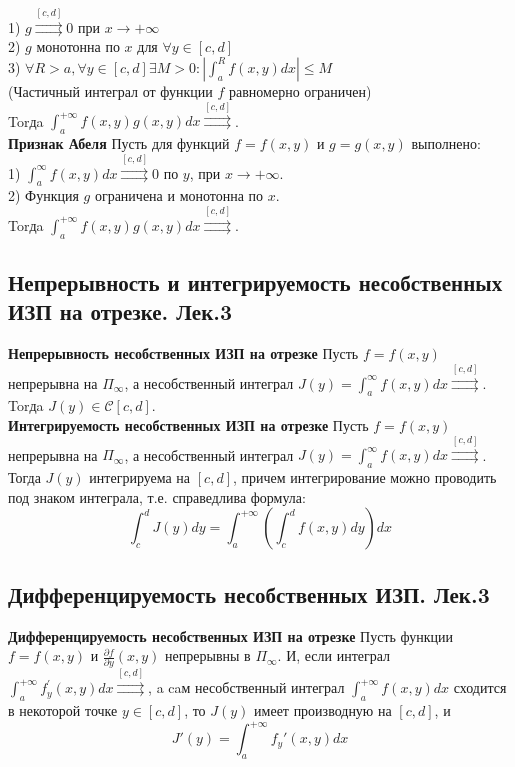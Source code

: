 \documentclass{article}
\begin{document}
	1) $ g \stackrel{[c, d]}{\rightrightarrows} 0 $ при $ x \rightarrow+\infty$\\ 
	2) $ g$ монотонна по $ x $ для $ \forall y \in[c, d]$\\ 
	3) $\forall R>a, \forall y \in[c, d] \exists M>0:\left|\int_{a}^{R} f(x, y) d x\right| \leqslant M $\\
	(Частичный интеграл от функции $ f $ равномерно ограничен)\\
	Torдa  $\int_{a}^{+\infty} f(x, y) g(x, y) d x \stackrel{[c, d]}{\rightrightarrows}$.\\
	\textbf{Признак Абеля} Пусть для функций $ f=f(x, y) $ и $ g=g(x, y) $ выполнено:\\
	1) $ \int_{a}^{\infty} f(x, y) d x \stackrel{[c,d]}{\rightrightarrows} 0 $ по $ y$, при $ x \rightarrow+\infty$.\\ 
	2) Функция $ g $ ограничена и монотонна по $ x $.\\ 
	Torдa $ \int_{a}^{+\infty} f(x, y) g(x, y) d x \stackrel{[c, d]}{\rightrightarrows} $.\\
\subsection{Непрерывность и интегрируемость несобственных ИЗП на отрезке. Лек.3}
	\textbf{Непрерывность несобственных ИЗП на отрезке} Пусть $ f=f(x, y) $ непрерывна на $ \Pi_{\infty}$,  а несобственный интеграл $ J(y)=\int_{a}^{\infty} f(x, y) d x \stackrel{[c, d]}{\rightrightarrows} $.  Torдa $ J(y) \in \mathcal{C}[c, d]$.\\
	\textbf{Интегрируемость несобственных ИЗП на отрезке} Пусть $ f=f(x, y) $ непрерывна на $ \Pi_{\infty}$, а несобственный интеграл $J(y)=\int_{a}^{\infty} f(x, y) d x \stackrel{[c,d]}{\rightrightarrows}$. Тогда $J(y)$ интегрируема на $[c,d]$, причем интегрирование можно проводить под знаком интеграла, т.е. справедлива формула:
	\begin{equation}
	\label{3.1}
	\int_{c}^{d} J(y) d y=\int_{a}^{+\infty}\left(\int_{c}^{d} f(x, y) d y\right) d x
	\end{equation}
	
\subsection{Дифференцируемость несобственных ИЗП. Лек.3}
	\textbf{Дифференцируемость несобственных ИЗП на отрезке} Пусть функции $ f=f(x, y) $ и $ \frac{\partial f}{\partial y}(x, y) $ непрерывны в $ \Pi_{\infty} $. И, если интеграл $ \int_{a}^{+\infty} f_{y}^{\prime}(x, y) d x \stackrel{[c, d]}{\rightrightarrows}$, a caм несобственный интеграл $ \int_{a}^{+\infty} f(x, y) d x $ сходится в некоторой точке $ y \in[c, d]$, то $ J(y) $ имеет производную на $ [c, d]$, и
	\begin{equation}
	\label{4.1}
	J'(y)=\int_{a}^{+\infty} {f}_{y}'(x,y)dx
	\end{equation}
\end{document}
